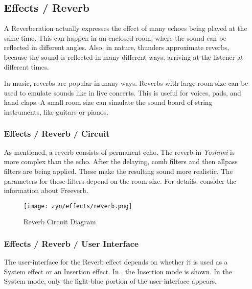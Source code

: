 

\subsection{Effects / Reverb}
\label{subsec:effects_edit_reverb}

   A Reverberation actually expresses the effect of many echoes being played
   at the same time. This can happen in an enclosed room, where the sound can
   be reflected in different angles. Also, in nature, thunders approximate
   reverbs, because the sound is reflected in many different ways, arriving
   at the listener at different times.

   In music, reverbs are popular in many ways. Reverbs with large room size
   can be used to emulate sounds like in live concerts. This is useful for
   voices, pads, and hand claps. A small room size can simulate the sound
   board of string instruments, like guitars or pianos.

\subsubsection{Effects / Reverb / Circuit}
\label{subsubsec:effects_edit_reverb_circuit}

   As mentioned, a reverb consists of permanent echo. The reverb in
   \textsl{Yoshimi} is more complex than the echo. After the delaying, comb
   filters and then allpass filters are being applied. These make the
   resulting sound more realistic. The parameters for these filters depend on
   the room size. For details, consider the information about Freeverb.

\begin{figure}[H]
   \centering
   \texttt{[image: zyn/effects/reverb.png]}
   \caption{Reverb Circuit Diagram}
   \label{fig:reverb_circuit_diagram}
\end{figure}

\subsubsection{Effects / Reverb / User Interface}
\label{subsubsec:effects_edit_reverb_ui}

   The user-interface for the Reverb effect depends on whether it is used as a
   System effect or an Insertion effect.
   In ,
   the Insertion mode is shown.  In the System mode, only the light-blue
   portion of the user-interface appears.

